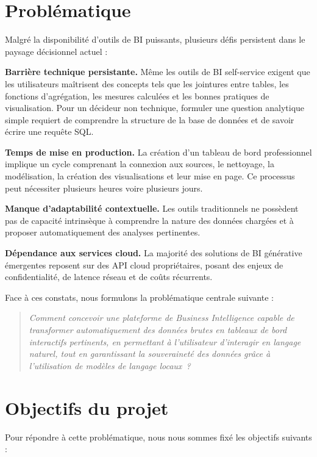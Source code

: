 \section{Problématique}

Malgré la disponibilité d'outils de BI puissants, plusieurs défis persistent dans le paysage décisionnel actuel :

\textbf{Barrière technique persistante.} Même les outils de BI self-service exigent que les utilisateurs maîtrisent des concepts tels que les jointures entre tables, les fonctions d'agrégation, les mesures calculées et les bonnes pratiques de visualisation. Pour un décideur non technique, formuler une question analytique simple requiert de comprendre la structure de la base de données et de savoir écrire une requête SQL.

\textbf{Temps de mise en production.} La création d'un tableau de bord professionnel implique un cycle comprenant la connexion aux sources, le nettoyage, la modélisation, la création des visualisations et leur mise en page. Ce processus peut nécessiter plusieurs heures voire plusieurs jours.

\textbf{Manque d'adaptabilité contextuelle.} Les outils traditionnels ne possèdent pas de capacité intrinsèque à comprendre la nature des données chargées et à proposer automatiquement des analyses pertinentes.

\textbf{Dépendance aux services cloud.} La majorité des solutions de BI générative émergentes reposent sur des API cloud propriétaires, posant des enjeux de confidentialité, de latence réseau et de coûts récurrents.

Face à ces constats, nous formulons la problématique centrale suivante :

\begin{quote}
\textit{Comment concevoir une plateforme de Business Intelligence capable de transformer automatiquement des données brutes en tableaux de bord interactifs pertinents, en permettant à l'utilisateur d'interagir en langage naturel, tout en garantissant la souveraineté des données grâce à l'utilisation de modèles de langage locaux~?}
\end{quote}

\section{Objectifs du projet}

Pour répondre à cette problématique, nous nous sommes fixé les objectifs suivants :

